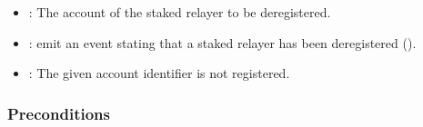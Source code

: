 \documentclass[a4paper,10pt,english]{sphinxmanual}
\begin{document}

\begin{itemize}
\item {} 
: The account of the staked relayer to be de\sphinxhyphen{}registered.

\end{itemize}

\begin{itemize}
\item {} 
: emit an event stating that a staked relayer has been de\sphinxhyphen{}registered ().

\end{itemize}

\begin{itemize}
\item {} 
: The given account identifier is not registered.

\end{itemize}


\subsubsection{Preconditions}
\label{\detokenize{spec/staked-relayers:id5}}
\end{document}
